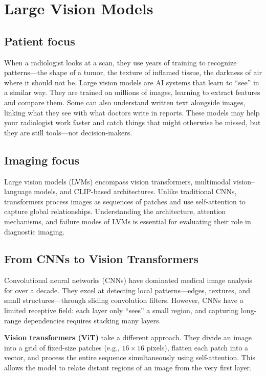 \chapter{Large Vision Models}

\section*{Patient focus}
When a radiologist looks at a scan, they use years of training to recognize patterns---the shape of a tumor, the texture of inflamed tissue, the darkness of air where it should not be. Large vision models are AI systems that learn to ``see'' in a similar way. They are trained on millions of images, learning to extract features and compare them. Some can also understand written text alongside images, linking what they see with what doctors write in reports. These models may help your radiologist work faster and catch things that might otherwise be missed, but they are still tools---not decision-makers.

\section*{Imaging focus}
Large vision models (LVMs) encompass vision transformers, multimodal vision--language models, and CLIP-based architectures. Unlike traditional CNNs, transformers process images as sequences of patches and use self-attention to capture global relationships. Understanding the architecture, attention mechanisms, and failure modes of LVMs is essential for evaluating their role in diagnostic imaging.
\label{ch:ch88_lvm}

\section{From CNNs to Vision Transformers}
Convolutional neural networks (CNNs) have dominated medical image analysis for over a decade. They excel at detecting local patterns---edges, textures, and small structures---through sliding convolution filters. However, CNNs have a limited receptive field: each layer only ``sees'' a small region, and capturing long-range dependencies requires stacking many layers.

\textbf{Vision transformers (ViT)} take a different approach. They divide an image into a grid of fixed-size patches (e.g., $16\times16$ pixels), flatten each patch into a vector, and process the entire sequence simultaneously using self-attention. This allows the model to relate distant regions of an image from the very first layer.

